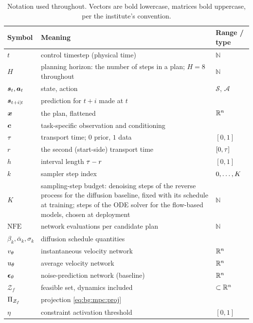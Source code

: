\begin{table}[htpb]
  \caption[Notation]{Notation used throughout. Vectors are bold lowercase, matrices bold
  uppercase, per the institute's convention.}
  \centering
  \label{tab:notation}
  \begin{tabularx}{\linewidth}{lLl}
    \toprule
    Symbol & Meaning & Range / type \\
    \midrule
    $t$ & control timestep (physical time) & $\mathbb{N}$ \\
    $H$ & planning horizon: the number of steps in a plan; $H=8$ throughout & $\mathbb{N}$ \\
    $\boldsymbol{s}_{t},\boldsymbol{a}_{t}$ & state, action & $\mathcal{S}$, $\mathcal{A}$ \\
    $\boldsymbol{s}_{t+i|t}$ & prediction for $t+i$ made at $t$ & \\
    $\boldsymbol{x}$ & the plan, flattened & $\mathbb{R}^{n}$ \\
    $\boldsymbol{c}$ & task-specific observation and conditioning & \\
    $\tau$ & transport time; $0$ prior, $1$ data & $[0,1]$ \\
    $r$ & the second (start-side) transport time & $[0,\tau]$ \\
    $h$ & interval length $\tau-r$ & $[0,1]$ \\
    $k$ & sampler step index & $0,\dots,K$ \\
    $K$ & sampling-step budget: denoising steps of the reverse process
      for the diffusion baseline, fixed with its schedule at training; steps of the \ac{ODE} solver
      for the flow-based models, chosen at deployment & $\mathbb{N}$ \\
    $\mathrm{NFE}$ & network evaluations per candidate plan & $\mathbb{N}$ \\
    $\beta_{k},\bar{\alpha}_{k},\sigma_{k}$ & diffusion schedule quantities & \\
    $v_{\theta}$ & instantaneous velocity network & $\mathbb{R}^{n}$ \\
    $u_{\theta}$ & average velocity network & $\mathbb{R}^{n}$ \\
    $\boldsymbol{\epsilon}_{\theta}$ & noise-prediction network (baseline) & $\mathbb{R}^{n}$ \\
    $\mathcal{Z}_{f}$ & feasible set, dynamics included & $\subset\mathbb{R}^{n}$ \\
    $\Pi_{\mathcal{Z}_{f}}$ & projection \eqref{eq:bg:mpc:proj} & \\
    $\eta$ & constraint activation threshold & $[0,1]$ \\

\end{tabularx}
\end{table}
